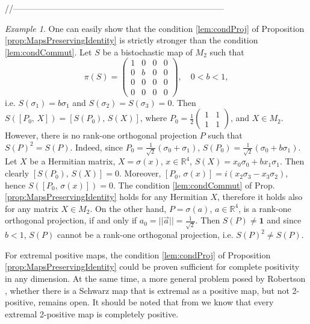 \documentclass[12pt]{article}
\theoremstyle{plain}
\theoremstyle{definition}
\theoremstyle{remark}
\newtheorem{example}{Example}
\numberwithin{equation}{section}
\begin{document}
//---------------------------------------------------------------------------
\begin{example}
One can easily show that the condition \ref{lem:condProj} of
Proposition \ref{prop:MapsPreservingIdentity} is strictly stronger than the
condition \ref{lem:condCommut}.
Let $S$ be a bistochastic map of $M_{2}$ such that
\begin{equation}
\label{RandomLabel:514431}
    \pi(S) = \begin{pmatrix}
    1 & 0 & 0 & 0 \\
    0 & b & 0 & 0 \\
    0 & 0 & 0 & 0 \\
    0 & 0 & 0 & 0
    \end{pmatrix},
    \quad 0 < b < 1,
\end{equation}
i.e. $S(\sigma_{1}) = b \sigma_{1}$ and
$S(\sigma_{2}) = S(\sigma_{3}) = 0$.  
Then $S\left( [P_{0}, \, X ] \right) = [ S(P_{0}), \, S(X) ]$,
where
$P_{0}= \frac{1}{2} \left( \begin{smallmatrix}
 1 & 1 \\ 1 & 1
 \end{smallmatrix} \right)$, and $X \in M_{2}$.
However, there is no rank-one orthogonal projection $P$
such that $S(P)^{2} = S(P)$.
Indeed,
since
$P_{0} = \frac{1}{\sqrt{2}}(\sigma_{0} + \sigma_{1})$,
$S(P_{0}) = \frac{1}{\sqrt{2}}(\sigma_{0} + b \sigma_{1})$.
Let $X$ be a Hermitian matrix, $X = \sigma(x)$, $x \in \mathbb{R}^{4}$,
$S(X) = x_{0} \sigma_{0} + b x_{1} \sigma_{1}$.
Then clearly $[S(P_{0}), \, S(X) ] =0$. 
Moreover,
$[P_{0}, \, \sigma(x)] = 
i(x_{2} \sigma_{3} - x_{3} \sigma_{2})$,
hence 
$S([P_{0}, \, \sigma(x)]) = 0$.
The condition \ref{lem:condCommut} of Prop. \ref{prop:MapsPreservingIdentity}
holds for any Hermitian $X$, therefore it holds also for any matrix $X \in M_{2}$.  
On the other hand, 
$P = \sigma(a)$, $a \in \mathbb{R}^{4}$, is a rank-one orthogonal projection,
if and only if $a_{0} = ||\vec{a}|| = \frac{1}{\sqrt{2}}$.
Then $S(P) \neq \mathbf{1}$ and since $b<1$,
$S(P)$ cannot be a rank-one orthogonal projection,
i.e. $S(P)^{2} \neq S(P)$.    
\end{example}

For extremal positive maps, the condition \ref{lem:condProj} of
Proposition \ref{prop:MapsPreservingIdentity} could be proven sufficient for
complete positivity in any dimension.
At the same time, a more general problem posed by Robertson \cite{robertson1983schwarz},
whether there is a Schwarz map that is extremal as a positive map,
but not \mbox{2-positive}, remains open.
It should be noted that from \cite[Theorem 3.3]{marciniak2008extremal}
we know that every extremal 2-positive map is completely positive.
\end{document}
